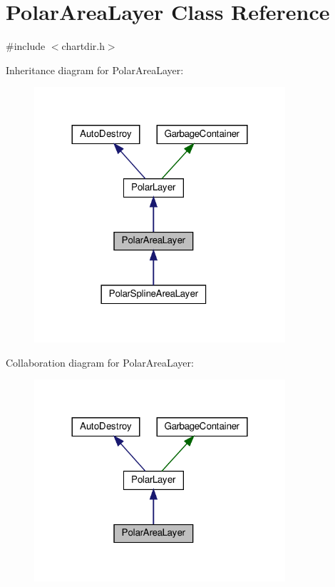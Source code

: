 \hypertarget{class_polar_area_layer}{}\section{Polar\+Area\+Layer Class Reference}
\label{class_polar_area_layer}


{\ttfamily \#include $<$chartdir.\+h$>$}



Inheritance diagram for Polar\+Area\+Layer\+:
\nopagebreak
\begin{figure}[H]
\begin{center}
\leavevmode
\includegraphics[width=264pt]{class_polar_area_layer__inherit__graph}
\end{center}
\end{figure}


Collaboration diagram for Polar\+Area\+Layer\+:
\nopagebreak
\begin{figure}[H]
\begin{center}
\leavevmode
\includegraphics[width=264pt]{class_polar_area_layer__coll__graph}
\end{center}
\end{figure}
